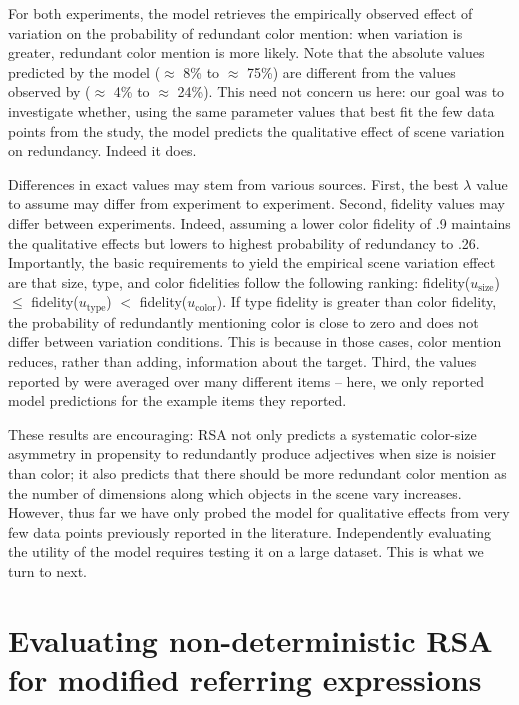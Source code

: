 \documentclass[11pt]{article}
\begin{document}
For both experiments, the model retrieves the empirically observed effect of variation on the probability of redundant color mention: when variation is greater, redundant color mention is more likely. Note that the absolute values predicted by the model ($\approx$ 8\% to $\approx$ 75\%) are different from the values observed by   ($\approx$ 4\% to $\approx$ 24\%). This need not concern us here: our goal was to investigate whether, using the same parameter values that best fit the few data points from the  study, the model predicts the qualitative effect of scene variation on redundancy. Indeed it does. 

Differences in exact values may stem from various sources. First, the best $\lambda$ value to assume may differ from experiment to experiment. Second, fidelity values may differ between experiments. Indeed, assuming a lower color fidelity of .9 maintains the qualitative effects but lowers to highest probability of redundancy to .26. Importantly, the basic requirements to yield the empirical scene variation effect are that size, type, and color fidelities follow the following ranking: fidelity($u_{\textrm{size}}$) $\leq$ fidelity($u_{\textrm{type}}$) $<$ fidelity($u_{\textrm{color}}$). If type fidelity is greater than color fidelity, the probability of redundantly mentioning color is close to zero and does not differ between variation conditions. This is because in those cases, color mention reduces, rather than adding, information about the target. Third, the values reported by  were averaged over many different items -- here, we only reported model predictions for the example items they reported.

These results are encouraging: RSA not only predicts a systematic color-size asymmetry in propensity to redundantly produce adjectives when size is noisier than color; it also predicts that there should be more redundant color mention as the number of dimensions along which objects in the scene vary increases. However, thus far we have only probed the model for qualitative effects from very few data points previously reported in the literature. Independently evaluating the utility of the model requires  testing it on a large dataset. This is what we turn to next.

\section{Evaluating non-deterministic RSA for modified referring expressions}
\end{document}
